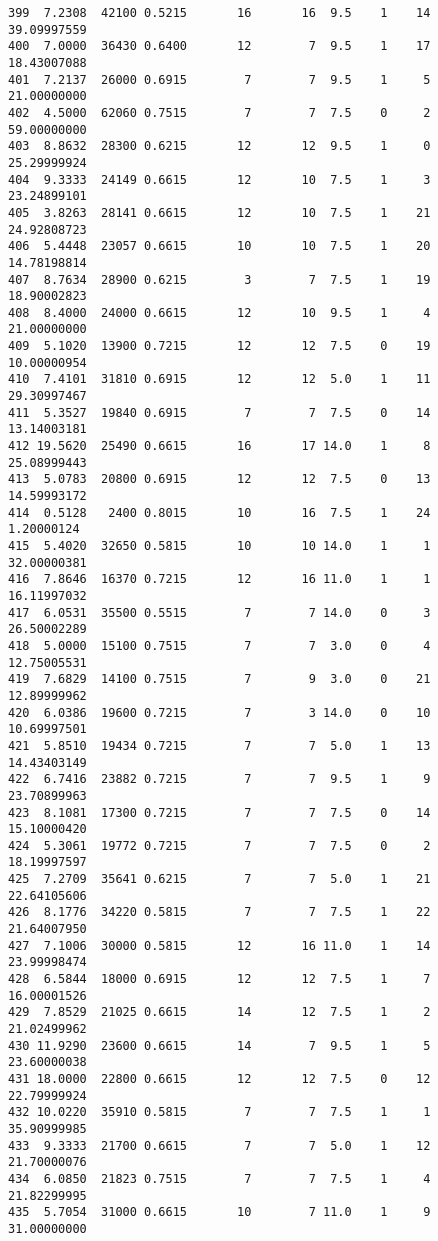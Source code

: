 \documentclass[
  letterpaper,
  DIV=11,
  numbers=noendperiod]{scrreprt}
\begin{document}
\begin{verbatim}
399  7.2308  42100 0.5215       16       16  9.5    1    14 39.09997559
400  7.0000  36430 0.6400       12        7  9.5    1    17 18.43007088
401  7.2137  26000 0.6915        7        7  9.5    1     5 21.00000000
402  4.5000  62060 0.7515        7        7  7.5    0     2 59.00000000
403  8.8632  28300 0.6215       12       12  9.5    1     0 25.29999924
404  9.3333  24149 0.6615       12       10  7.5    1     3 23.24899101
405  3.8263  28141 0.6615       12       10  7.5    1    21 24.92808723
406  5.4448  23057 0.6615       10       10  7.5    1    20 14.78198814
407  8.7634  28900 0.6215        3        7  7.5    1    19 18.90002823
408  8.4000  24000 0.6615       12       10  9.5    1     4 21.00000000
409  5.1020  13900 0.7215       12       12  7.5    0    19 10.00000954
410  7.4101  31810 0.6915       12       12  5.0    1    11 29.30997467
411  5.3527  19840 0.6915        7        7  7.5    0    14 13.14003181
412 19.5620  25490 0.6615       16       17 14.0    1     8 25.08999443
413  5.0783  20800 0.6915       12       12  7.5    0    13 14.59993172
414  0.5128   2400 0.8015       10       16  7.5    1    24  1.20000124
415  5.4020  32650 0.5815       10       10 14.0    1     1 32.00000381
416  7.8646  16370 0.7215       12       16 11.0    1     1 16.11997032
417  6.0531  35500 0.5515        7        7 14.0    0     3 26.50002289
418  5.0000  15100 0.7515        7        7  3.0    0     4 12.75005531
419  7.6829  14100 0.7515        7        9  3.0    0    21 12.89999962
420  6.0386  19600 0.7215        7        3 14.0    0    10 10.69997501
421  5.8510  19434 0.7215        7        7  5.0    1    13 14.43403149
422  6.7416  23882 0.7215        7        7  9.5    1     9 23.70899963
423  8.1081  17300 0.7215        7        7  7.5    0    14 15.10000420
424  5.3061  19772 0.7215        7        7  7.5    0     2 18.19997597
425  7.2709  35641 0.6215        7        7  5.0    1    21 22.64105606
426  8.1776  34220 0.5815        7        7  7.5    1    22 21.64007950
427  7.1006  30000 0.5815       12       16 11.0    1    14 23.99998474
428  6.5844  18000 0.6915       12       12  7.5    1     7 16.00001526
429  7.8529  21025 0.6615       14       12  7.5    1     2 21.02499962
430 11.9290  23600 0.6615       14        7  9.5    1     5 23.60000038
431 18.0000  22800 0.6615       12       12  7.5    0    12 22.79999924
432 10.0220  35910 0.5815        7        7  7.5    1     1 35.90999985
433  9.3333  21700 0.6615        7        7  5.0    1    12 21.70000076
434  6.0850  21823 0.7515        7        7  7.5    1     4 21.82299995
435  5.7054  31000 0.6615       10        7 11.0    1     9 31.00000000

\end{verbatim}
\end{document}
